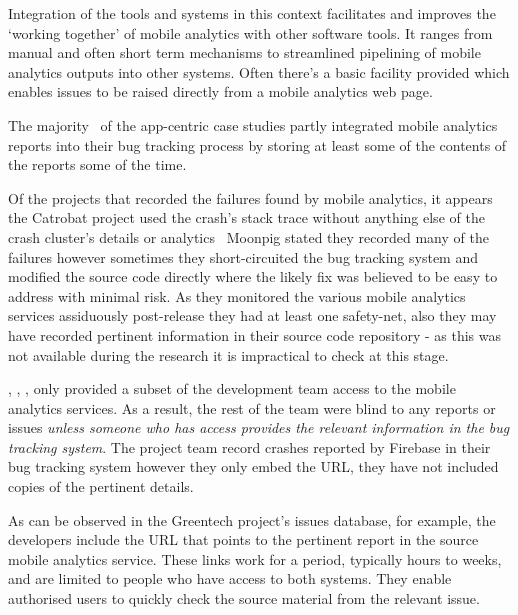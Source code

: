 Integration of the tools and systems in this context facilitates and improves the `working together' of mobile analytics with other software tools. It ranges from manual and often short term mechanisms to streamlined pipelining of mobile analytics outputs into other systems. Often there's a basic facility provided which enables issues to be raised directly from a mobile analytics web page.

The majority~ of the app-centric case studies partly integrated mobile analytics reports into their bug tracking process by storing at least some of the contents of the reports some of the time.  

Of the projects that recorded the failures found by mobile analytics, it appears the Catrobat project used the crash's stack trace without anything else of the crash cluster's details or analytics~ Moonpig stated they recorded many of the failures however sometimes they short-circuited the bug tracking system and modified the source code directly where the likely fix was believed to be easy to address with minimal risk. As they monitored the various mobile analytics services assiduously post-release they had at least one safety-net, also they may have recorded pertinent information in their source code repository - as this was not available during the research it is impractical to check at this stage.

, , , only provided a subset of the development team access to the mobile analytics services. As a result, the rest of the team were blind to any reports or issues \emph{unless someone who has access provides the relevant information in the bug tracking system}. The  project team record crashes reported by Firebase in their bug tracking system however they only embed the URL, they have not included copies of the pertinent details.

As can be observed in the Greentech project's issues database, for example, the developers include the URL that points to the pertinent report in the source mobile analytics service. These links work for a period, typically hours to weeks, and are limited to people who have access to both systems. They enable authorised users to quickly check the source material from the relevant issue. 

